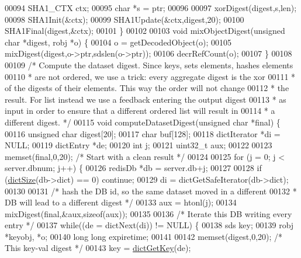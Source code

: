 \begin{DoxyCode}
00094     SHA1\_CTX ctx;
00095     \textcolor{keywordtype}{char} *s = ptr;
00096 
00097     xorDigest(digest,s,len);
00098     SHA1Init(&ctx);
00099     SHA1Update(&ctx,digest,20);
00100     SHA1Final(digest,&ctx);
00101 \}
00102 
00103 \textcolor{keywordtype}{void} mixObjectDigest(\textcolor{keywordtype}{unsigned} \textcolor{keywordtype}{char} *digest, robj *o) \{
00104     o = getDecodedObject(o);
00105     mixDigest(digest,o->ptr,sdslen(o->ptr));
00106     decrRefCount(o);
00107 \}
00108 
00109 \textcolor{comment}{/* Compute the dataset digest. Since keys, sets elements, hashes elements}
00110 \textcolor{comment}{ * are not ordered, we use a trick: every aggregate digest is the xor}
00111 \textcolor{comment}{ * of the digests of their elements. This way the order will not change}
00112 \textcolor{comment}{ * the result. For list instead we use a feedback entering the output digest}
00113 \textcolor{comment}{ * as input in order to ensure that a different ordered list will result in}
00114 \textcolor{comment}{ * a different digest. */}
00115 \textcolor{keywordtype}{void} computeDatasetDigest(\textcolor{keywordtype}{unsigned} \textcolor{keywordtype}{char} *final) \{
00116     \textcolor{keywordtype}{unsigned} \textcolor{keywordtype}{char} digest[20];
00117     \textcolor{keywordtype}{char} buf[128];
00118     dictIterator *di = NULL;
00119     dictEntry *de;
00120     \textcolor{keywordtype}{int} j;
00121     uint32\_t aux;
00122 
00123     memset(final,0,20); \textcolor{comment}{/* Start with a clean result */}
00124 
00125     \textcolor{keywordflow}{for} (j = 0; j < server.dbnum; j++) \{
00126         redisDb *db = server.db+j;
00127 
00128         \textcolor{keywordflow}{if} (\hyperlink{dict_8h_af193430dd3d5579a52b194512f72c1f0}{dictSize}(db->dict) == 0) \textcolor{keywordflow}{continue};
00129         di = dictGetSafeIterator(db->dict);
00130 
00131         \textcolor{comment}{/* hash the DB id, so the same dataset moved in a different}
00132 \textcolor{comment}{         * DB will lead to a different digest */}
00133         aux = htonl(j);
00134         mixDigest(final,&aux,\textcolor{keyword}{sizeof}(aux));
00135 
00136         \textcolor{comment}{/* Iterate this DB writing every entry */}
00137         \textcolor{keywordflow}{while}((de = dictNext(di)) != NULL) \{
00138             sds key;
00139             robj *keyobj, *o;
00140             \textcolor{keywordtype}{long} \textcolor{keywordtype}{long} expiretime;
00141 
00142             memset(digest,0,20); \textcolor{comment}{/* This key-val digest */}
00143             key = \hyperlink{dict_8h_a3271c334309904a3086deca94f96e46e}{dictGetKey}(de);

\end{DoxyCode}
